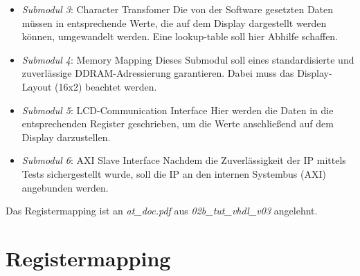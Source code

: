\begin{itemize}
\begin{figure}[h!]
\begin{minipage}{0.15\textwidth}
   \end{minipage}
        \caption{Startup Sequence}
        \label{fig:startup_sequence}
    \end{figure}
    \newline
    Graphik \ref{fig:startup_sequence} zeigt die Initialisierung des Displays und die damit verbundenen Timing-Anforderungen.
    \item \textit{Submodul 3}: Character Transfomer  \newline
    Die von der Software gesetzten Daten müssen in entsprechende Werte, die auf dem Display dargestellt werden können, umgewandelt werden. Eine lookup-table soll hier Abhilfe schaffen.
    \item \textit{Submodul 4}: Memory Mapping  \newline
    Dieses Submodul soll eines standardisierte und zuverlässige DDRAM-Adressierung garantieren. Dabei muss das Display-Layout (16x2) beachtet werden.
    \item \textit{Submodul 5}: LCD-Communication Interface  \newline
    Hier werden die Daten in die entsprechenden Register geschrieben, um die Werte anschließend auf dem Display darzustellen.
    \item \textit{Submodul 6}: AXI Slave Interface  \newline
    Nachdem die Zuverlässigkeit der IP mittels Tests sichergestellt wurde, soll die IP an den internen Systembus (AXI) angebunden werden.
\end{itemize}

Das Registermapping ist an \textit{at\_doc.pdf} aus \textit{02b\_tut\_vhdl\_v03} angelehnt.

\section{Registermapping}


